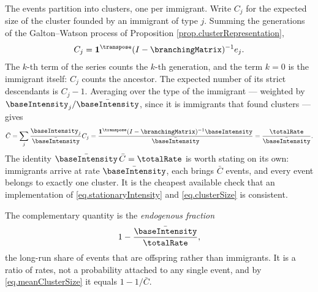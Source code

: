 The events partition into clusters, one per immigrant.
Write $C_j$ for the expected size of the cluster founded by an immigrant of type $j$.
Summing the generations of the Galton--Watson process of
Proposition \ref{prop.clusterRepresentation},
\begin{equation}\label{eq.clusterSize}
 C_j = \mathbf{1}^{\transpose} (I - \branchingMatrix)^{-1} e_j .
\end{equation}
The $k$-th term of the series counts the $k$-th generation,
and the term $k=0$ is the immigrant itself:
$C_j$ counts the ancestor.
The expected number of its strict descendants is $C_j - 1$.
Averaging over the type of the immigrant --- weighted by $\baseIntensity_j / \bar{\baseIntensity}$,
since it is immigrants that found clusters --- gives
\begin{equation}\label{eq.meanClusterSize}
 \bar{C} = \sum_j \frac{\baseIntensity_j}{\bar{\baseIntensity}} C_j
 = \frac{\mathbf{1}^{\transpose}(I-\branchingMatrix)^{-1}\baseIntensity}{\bar{\baseIntensity}}
 = \frac{\totalRate}{\bar{\baseIntensity}} .
\end{equation}
The identity $\bar{\baseIntensity} \, \bar{C} = \totalRate$ is worth stating on its own:
immigrants arrive at rate $\bar{\baseIntensity}$, each brings $\bar C$ events,
and every event belongs to exactly one cluster.
It is the cheapest available check that an implementation of
\eqref{eq.stationaryIntensity} and \eqref{eq.clusterSize} is consistent.

The complementary quantity is the \emph{endogenous fraction}
\begin{equation}\label{eq.endogenousFraction}
 1 - \frac{\bar{\baseIntensity}}{\totalRate},
\end{equation}
the long-run share of events that are offspring rather than immigrants.
It is a ratio of rates, not a probability attached to any single event,
and by \eqref{eq.meanClusterSize} it equals $1 - 1/\bar C$.


